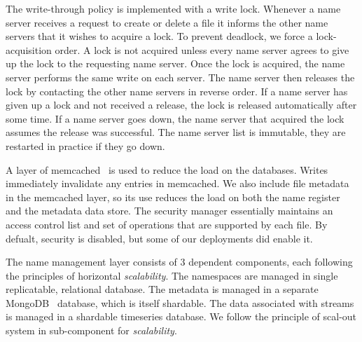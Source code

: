 The write-through policy is implemented with a write lock.  Whenever a name server receives a request to create or delete a file it informs the
other name servers that it wishes to acquire a lock.  To prevent deadlock, we force a lock-acquisition order.  A lock is not acquired unless every
name server agrees to give up the lock to the requesting name server.  Once the lock is acquired, the name server performs the same write on each
server.  The name server then releases the lock by contacting the other name servers in reverse order.  If a name server has given up a lock
and not received a release, the lock is released automatically after some time.  If a name server goes down, the name server that acquired the lock
assumes the release was successful.  The name server list is immutable, they are restarted in practice if they go down.

A layer of memcached~\cite{memcached} is used to reduce the load on the databases.  Writes immediately invalidate any entries in memcached.  
We also include file metadata in the memcached layer, so its use reduces the load on both the name register and the metadata data store.
The security manager essentially maintains an access control list and set of operations that are supported by each file.  By defualt, 
security is disabled, but some of our deployments did enable it.

The name management layer consists of 3 dependent components, each following the principles of horizontal \emph{scalability}.  The namespaces are
managed in single replicatable, relational database.  The metadata is managed in a separate MongoDB~\cite{mongodb} database, which is itself
shardable.  The data associated with streams is managed in a shardable timeseries database.  We follow the principle of scal-out
system in sub-component for \emph{scalability}.












